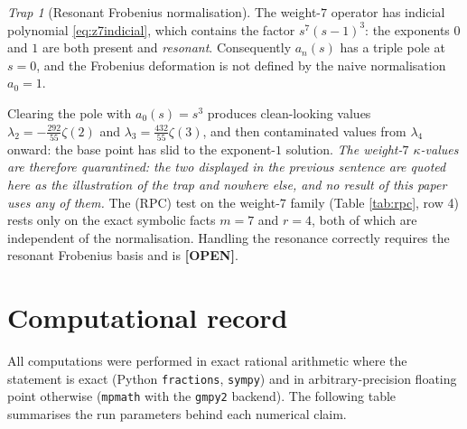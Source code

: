 \documentclass[11pt,reqno]{amsart}
\theoremstyle{plain}
\theoremstyle{definition}
\theoremstyle{remark}
\newtheorem{trap}[theorem]{Trap}
\newcommand{\OPEN}{{\normalfont\sffamily\bfseries[OPEN]}}
\begin{document}
\begin{trap}[Resonant Frobenius normalisation]\label{trap:resonance}
The weight-$7$ operator has indicial polynomial \eqref{eq:z7indicial}, which contains the factor
$s^{7}(s-1)^{3}$: the exponents $0$ and $1$ are both present and \emph{resonant}. Consequently
$a_n(s)$ has a triple pole at $s=0$, and the Frobenius deformation is not defined by the naive
normalisation $a_0=1$.

Clearing the pole with $a_0(s)=s^3$ produces clean-looking values
$\lambda_2=-\tfrac{292}{55}\zeta(2)$ and $\lambda_3=\tfrac{432}{55}\zeta(3)$, and then
contaminated values from $\lambda_4$ onward: the base point has slid to the exponent-$1$
solution. \emph{The weight-$7$ $\kappa$-values are therefore quarantined: the two displayed in
the previous sentence are quoted here as the illustration of the trap and nowhere else, and no
result of this paper uses any of them.} The (RPC) test on the weight-$7$ family (Table \ref{tab:rpc}, row 4)
rests only on the exact symbolic facts $m=7$ and $r=4$, both of which are independent of the
normalisation. Handling the resonance correctly requires the resonant Frobenius basis and is
\OPEN.
\end{trap}

\section{Computational record}\label{app:record}

All computations were performed in exact rational arithmetic where the statement is exact
(Python \texttt{fractions}, \texttt{sympy}) and in arbitrary-precision floating point otherwise
(\texttt{mpmath} with the \texttt{gmpy2} backend). The following table summarises the run
parameters behind each numerical claim.
\end{document}
